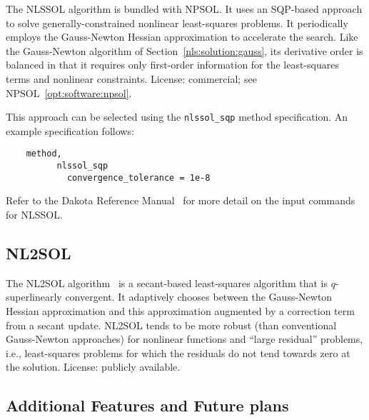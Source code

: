 The NLSSOL algorithm is bundled with NPSOL. It uses an SQP-based
approach to solve generally-constrained nonlinear least-squares
problems. It periodically employs the Gauss-Newton Hessian
approximation to accelerate the search. Like the Gauss-Newton
algorithm of Section~\ref{nls:solution:gauss}, its derivative order is
balanced in that it requires only first-order information for the
least-squares terms and nonlinear constraints. License: commercial;
see NPSOL~\ref{opt:software:npsol}.

This approach can be selected using the \texttt{nlssol\_sqp} method
specification. An example specification follows:
\begin{small}
\begin{verbatim}
    method,
          nlssol_sqp
            convergence_tolerance = 1e-8
\end{verbatim}
\end{small}

Refer to the Dakota Reference Manual~\cite{RefMan} for more detail on the
input commands for NLSSOL.

\subsection{NL2SOL}\label{nls:solution:nl2sol}

The NL2SOL algorithm~\cite{Den81} is a secant-based least-squares
algorithm that is $q$-superlinearly convergent. It adaptively chooses
between the Gauss-Newton Hessian approximation and this approximation
augmented by a correction term from a secant update. NL2SOL tends to
be more robust (than conventional Gauss-Newton approaches) for
nonlinear functions and ``large residual'' problems, i.e.,
least-squares problems for which the residuals do not tend towards
zero at the solution. License: publicly available.

\subsection{Additional Features and Future plans}\label{nls:solution:future}

